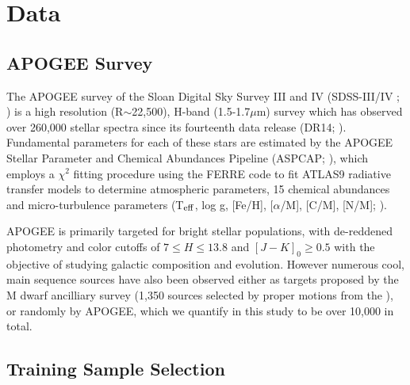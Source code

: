 \documentclass[preprint]{aastex62}
\begin{document}


\section{Data} \label{sec:data}

\subsection{APOGEE Survey}


The APOGEE survey \citep{Majewski:2015} of the Sloan Digital Sky Survey III and IV (SDSS-III/IV \citealt{Eisenstein:2011}; \citealt{Blanton:2017}) is a high resolution (R$\sim$22,500), H-band (1.5-1.7$\mu$m) survey which has observed over 260,000 stellar spectra since its fourteenth data release (DR14; \citealt{Abolfathi:2017}). Fundamental parameters for each of these stars are estimated by the APOGEE Stellar Parameter and Chemical Abundances Pipeline (ASPCAP; \citealt{Perez:2016}), which employs a $\chi^2$ fitting procedure using the FERRE code to fit ATLAS9 radiative transfer models \citep{Castelli:2004} to determine atmospheric parameters, 15 chemical abundances and micro-turbulence parameters (T$_{\rm eff}$, log g, [Fe/H], [$\alpha$/M], [C/M], [N/M]; \citealt{Meszaros:2012}). 

APOGEE is primarily targeted for bright stellar populations, with de-reddened photometry and color cutoffs of $7 \leq H \leq 13.8$ and $[J-K]_0 \geq 0.5$ \citep{Zasowski:2013} with the objective of studying galactic composition and evolution. However numerous cool, main sequence sources have also been observed either as targets proposed by the M dwarf ancilliary survey (1,350 sources selected by proper motions from the  \citealt{Desphande:2013}), or randomly by APOGEE, which we quantify in this study to be over 10,000 in total.


\subsection{Training Sample Selection}
\end{document}
